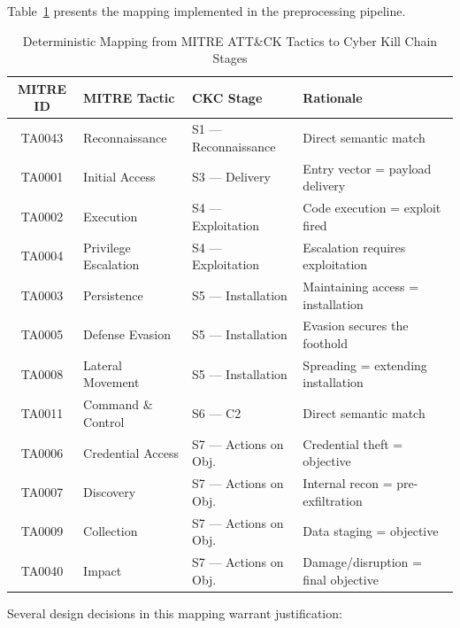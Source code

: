Table~\ref{tab:mitre_ckc_mapping} presents the mapping implemented in the preprocessing pipeline.

\begin{table}[H]
    \centering
    \caption{Deterministic Mapping from MITRE ATT\&CK Tactics to Cyber Kill Chain Stages}
    \label{tab:mitre_ckc_mapping}
    \begin{tabular}{clll}
        \toprule
        \textbf{MITRE ID} & \textbf{MITRE Tactic} & \textbf{CKC Stage} & \textbf{Rationale} \\
        \midrule
        TA0043 & Reconnaissance & S1 — Reconnaissance & Direct semantic match \\
        TA0001 & Initial Access & S3 — Delivery & Entry vector = payload delivery \\
        TA0002 & Execution & S4 — Exploitation & Code execution = exploit fired \\
        TA0004 & Privilege Escalation & S4 — Exploitation & Escalation requires exploitation \\
        TA0003 & Persistence & S5 — Installation & Maintaining access = installation \\
        TA0005 & Defense Evasion & S5 — Installation & Evasion secures the foothold \\
        TA0008 & Lateral Movement & S5 — Installation & Spreading = extending installation \\
        TA0011 & Command \& Control & S6 — C2 & Direct semantic match \\
        TA0006 & Credential Access & S7 — Actions on Obj. & Credential theft = objective \\
        TA0007 & Discovery & S7 — Actions on Obj. & Internal recon = pre-exfiltration \\
        TA0009 & Collection & S7 — Actions on Obj. & Data staging = objective \\
        TA0040 & Impact & S7 — Actions on Obj. & Damage/disruption = final objective \\
        \bottomrule
    \end{tabular}
\end{table}

Several design decisions in this mapping warrant justification:

